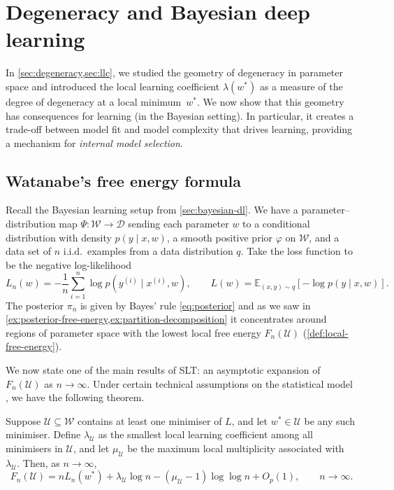 \documentclass[11pt]{article}
\newcommand{\E}{\mathbb{E}}
\newcommand{\W}{\mathcal{W}}
\newcommand{\D}{\mathcal{D}}
\newcommand{\U}{\mathcal{U}}
\begin{document}
\clearpage
\section{Degeneracy and Bayesian deep learning}
\label{sec:fef}

In \cref{sec:degeneracy,sec:llc}, we studied the geometry of degeneracy in parameter space and introduced the local learning coefficient $\lambda(w^*)$ as a measure of the degree of degeneracy at a local minimum~$w^*$. We now show that this geometry has consequences for learning (in the Bayesian setting). In particular, it creates a trade-off between model fit and model complexity that drives learning, providing a mechanism for \emph{internal model selection}.

\subsection{Watanabe's free energy formula}

Recall the Bayesian learning setup from \cref{sec:bayesian-dl}. We have a parameter--distribution map $\Psi : \W \to \D$ sending each parameter $w$ to a conditional distribution with density $p(y \mid x, w)$, a smooth positive prior $\varphi$ on $\W$, and a data set of $n$ i.i.d.\ examples from a data distribution $q$. Take the loss function to be the negative log-likelihood
\begin{equation*}
    L_n(w) = -\frac{1}{n}\sum_{i=1}^n \log p(y^{(i)} \mid x^{(i)}, w),
    \qquad
    L(w) = \E_{(x,y) \sim q}\!\left[-\log p(y \mid x, w)\right].
\end{equation*}
The posterior $\pi_n$ is given by Bayes' rule \eqref{eq:posterior} and as we saw in \cref{ex:posterior-free-energy,ex:partition-decomposition} it concentrates around regions of parameter space with the lowest local free energy $F_n(\U)$ (\cref{def:local-free-energy}).

We now state one of the main results of SLT: an asymptotic expansion of $F_n(\U)$ as $n \to \infty$. Under certain technical assumptions on the statistical model \citetext{\citealp{Watanabe2018}; see \citealp[][\S 2.3.1]{Lau2025} for a summary}, we have the following theorem.


\begin{theorem}
\label{thm:fef}
    Suppose $\U \subseteq \W$ contains at least one minimiser of $L$, and let $w^* \in \U$ be any such minimiser. Define $\lambda_{\U}$ as the smallest local learning coefficient among all minimisers in $\U$, and let $\mu_{\U}$ be the maximum local multiplicity associated with $\lambda_{\U}$. Then, as $n \to \infty$,
    \begin{equation}
    \label{eq:fef}
        F_n(\U) = nL_n(w^*) + \lambda_{\U} \log n 
              - (\mu_{\U} - 1)\log \log n + O_p(1), \qquad n \to \infty.
    \end{equation}
\end{theorem}
\end{document}
